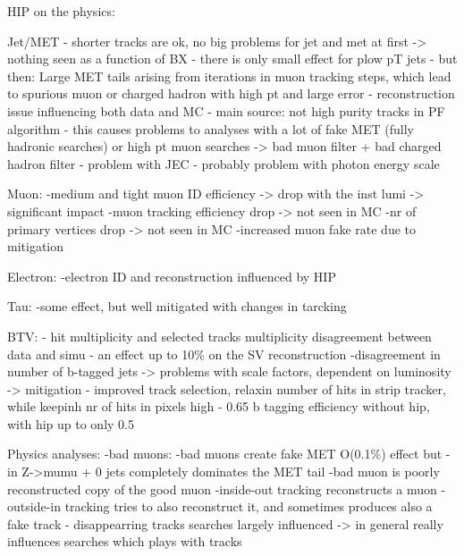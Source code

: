 HIP on the physics:

Jet/MET
- shorter tracks are ok, no big problems for jet and met at first -> nothing seen as a function of BX
- there is only small effect for plow pT jets
- but then: Large MET tails arising from iterations in muon tracking steps, which lead to spurious muon or charged hadron with high pt and large error
	- reconstruction issue influencing both data and MC
	- main source: not high purity tracks in PF algorithm
	- this causes problems to analyses with a lot of fake MET (fully hadronic searches) or high pt muon searches
	-> bad muon filter + bad charged hadron filter    
- problem with JEC - probably problem with photon energy scale

Muon:
-medium and tight muon ID efficiency -> drop with the inst lumi -> significant impact
-muon tracking efficiency drop -> not seen in MC
-nr of primary vertices drop -> not seen in MC
-increased muon fake rate due to mitigation

Electron:
-electron ID and reconstruction influenced by HIP

Tau:
-some effect, but well mitigated with changes in tarcking

BTV:
- hit multiplicity and selected tracks multiplicity disagreement between data and simu
- an effect up to 10\% on the SV reconstruction
-disagreement in number of b-tagged jets
-> problems with scale factors, dependent on luminosity
-> mitigation - improved track selection, relaxin  number of hits in strip tracker, while keepinh nr of hits in pixels high
- 0.65 b tagging efficiency without hip, with hip up to only 0.5


Physics analyses:
-bad muons: %
-bad muons create fake MET O(0.1\%) effect but
-in Z->mumu + 0 jets completely dominates the MET tail
-bad muon is poorly reconstructed copy of the good muon
	-inside-out tracking reconstructs a muon
	-outside-in tracking tries to also reconstruct it, and sometimes produces also a fake track
- disappearring tracks searches largely influenced -> in general really influences searches which plays with tracks
